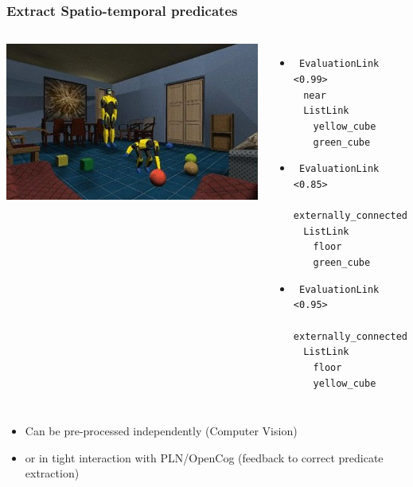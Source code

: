\documentclass{beamer}
\begin{document}
\frame
{
  \frametitle{Extract Spatio-temporal predicates}

  \begin{columns}

    \column{1.5in}

    \includegraphics[scale=0.3]{agisim_crop.jpg}
    
    \column{1.5in}

    \begin{itemize}
    \item 
      {\tiny
        {\tt 
          EvaluationLink <0.99>\\
          $\ \ \ \ $near\\
          $\ \ \ \ $ListLink\\
          $\ \ \ \ \ \ \ \ $yellow\_cube\\
          $\ \ \ \ \ \ \ \ $green\_cube\\
        }
      }
    \item
      {\tiny
        {\tt 
          EvaluationLink <0.85>\\
          $\ \ \ \ $externally\_connected\\
          $\ \ \ \ $ListLink\\
          $\ \ \ \ \ \ \ \ $floor\\
          $\ \ \ \ \ \ \ \ $green\_cube\\
        }
      }
    \item
      {\tiny
        {\tt 
          EvaluationLink <0.95>\\
          $\ \ \ \ $externally\_connected\\
          $\ \ \ \ $ListLink\\
          $\ \ \ \ \ \ \ \ $floor\\
          $\ \ \ \ \ \ \ \ $yellow\_cube\\
        }
      }
    \end{itemize}

  \end{columns}
  \pause
  \begin{itemize}
  \item<+-> Can be \alert{pre-processed independently} (Computer Vision)
  \item<+-> or in tight \alert{interaction with PLN/OpenCog} (feedback to
    correct predicate extraction)
  \end{itemize}
}
\end{document}

